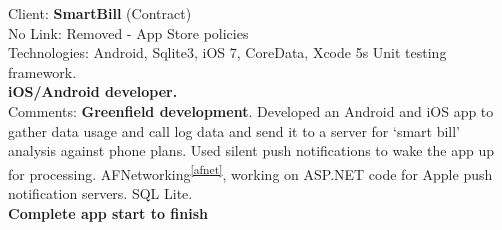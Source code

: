 \documentclass{article}
\begin{document}
%

Client: 	\textbf  {SmartBill} (Contract) \\
No Link: Removed - App Store policies \\
Technologies: 	Android, Sqlite3, iOS 7, CoreData, Xcode 5s Unit testing framework.  \\
\textbf{ iOS/Android developer.  }\\
Comments:	\textbf { Greenfield development}. Developed an Android and iOS app to gather data usage and call log data and send it to a server for ‘smart bill’ analysis against phone plans. Used silent push notifications to wake the app up for processing. AFNetworking\textsuperscript{\ref{afnet}}, working on ASP.NET code for Apple push notification servers. SQL Lite. \\
\textbf{Complete app start to finish} \\
\\
\end{document}
